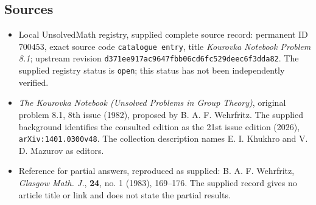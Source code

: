 \documentclass[11pt]{article}
\begin{document}
\subsection{Sources}
\begin{itemize}
\item Local UnsolvedMath registry, supplied complete source record: permanent ID \(700453\), exact source code \texttt{catalogue entry}, title \emph{Kourovka Notebook Problem 8.1}; upstream revision \texttt{d371ee917ac9647fbb06cd6fc529deec6f3dda82}. The supplied registry status is \texttt{open}; this status has not been independently verified.
\item \emph{The Kourovka Notebook (Unsolved Problems in Group Theory)}, original problem 8.1, 8th issue (1982), proposed by B. A. F. Wehrfritz. The supplied background identifies the consulted edition as the 21st issue edition (2026), \texttt{arXiv:1401.0300v48}. The collection description names E. I. Khukhro and V. D. Mazurov as editors.
\item Reference for partial answers, reproduced as supplied: B. A. F. Wehrfritz, \emph{Glasgow Math. J.}, \textbf{24}, no. 1 (1983), 169--176. The supplied record gives no article title or link and does not state the partial results.
\end{itemize}
\end{document}
